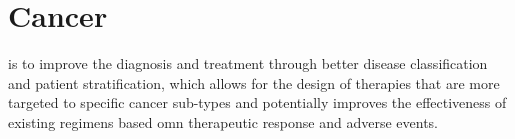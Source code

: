 \section{Cancer}
\label{cancer-discussion}


 is to improve the diagnosis and
treatment through better disease classification and patient stratification,
which allows for the design of therapies that are more targeted to specific
cancer sub-types and potentially improves the effectiveness of existing regimens
based omn therapeutic response and adverse events.

\clearpage

